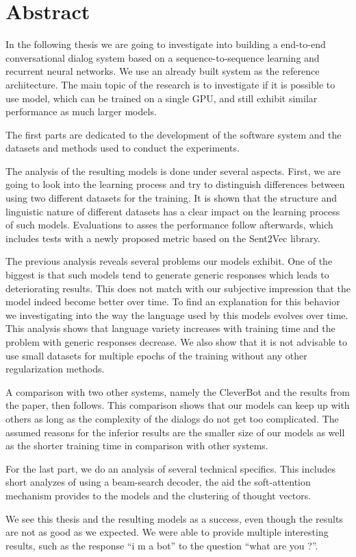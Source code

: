 \chapter*{Abstract}
In the following thesis we are going to investigate into building a end-to-end conversational dialog system based on a sequence-to-sequence learning and recurrent neural networks. We use an already built system as the reference architecture. The main topic of the research is to investigate if it is possible to use model, which can be trained on a single GPU, and still exhibit similar performance as much larger models.

The first parts are dedicated to the development of the software system and the datasets and methods used to conduct the experiments.

The analysis of the resulting models is done under several aspects. First, we are going to look into the learning process and try to distinguish differences between using two different datasets for the training. It is shown that the structure and linguistic nature of different datasets has a clear impact on the learning process of such models. Evaluations to asses the performance follow afterwards, which includes tests with a newly proposed metric based on the Sent2Vec library. 

The previous analysis reveals several problems our models exhibit. One of the biggest is that such models tend to generate generic responses which leads to deteriorating results. This does not match with our subjective impression that the model indeed become better over time. To find an explanation for this behavior we investigating into the way the language used by this models evolves over time. This analysis shows that language variety increases with training time and the problem with generic responses decrease. We also show that it is not advisable to use small datasets for multiple epochs of the training without any other regularization methods.

A comparison with two other systems, namely the CleverBot and the results from the paper, then follows. This comparison shows that our models can keep up with others as long as the complexity of the dialogs do not get too complicated. The assumed reasons for the inferior results are the smaller size of our models as well as the shorter training time in comparison with other systems.

For the last part, we do an analysis of several technical specifics. This includes short analyzes of using a beam-search decoder, the aid the soft-attention mechanism provides to the models and the clustering of thought vectors. 

We see this thesis and the resulting models as a success, even though the results are not as good as we expected. We were able to provide multiple interesting results, such as the response ``i m a bot'' to the question ``what are you ?''.
